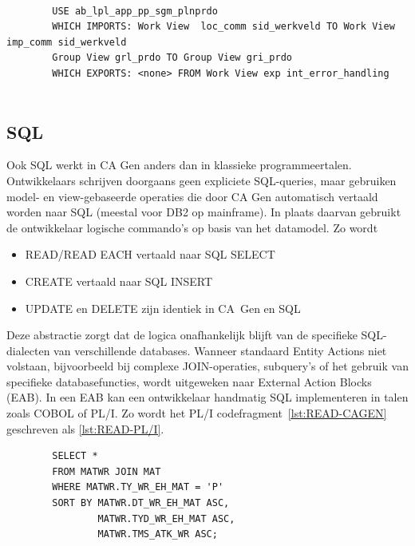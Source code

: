 \begin{listing}[h]
    \caption[Voorbeeld CA Gen-code: USE-statement]{CA Gen-code met een USE-statement en view matching}
    \label{lst:CAGEN-USE}
    \begin{verbatim}
        
        USE ab_lpl_app_pp_sgm_plnprdo
        WHICH IMPORTS: Work View  loc_comm sid_werkveld TO Work View imp_comm sid_werkveld
        Group View grl_prdo TO Group View gri_prdo
        WHICH EXPORTS: <none> FROM Work View exp int_error_handling
        
    \end{verbatim}
\end{listing}

\subsection{SQL}
Ook SQL werkt in CA Gen anders dan in klassieke programmeertalen. Ontwikkelaars schrijven doorgaans geen expliciete SQL-queries, maar gebruiken model- en view-gebaseerde operaties die door CA Gen automatisch vertaald worden naar SQL (meestal voor DB2 op mainframe). In plaats daarvan gebruikt de ontwikkelaar logische commando's op basis van het datamodel. Zo wordt
\begin{itemize}
    \item READ/READ EACH vertaald naar SQL SELECT
    \item CREATE vertaald naar SQL INSERT
    \item UPDATE en DELETE zijn identiek in CA~Gen en SQL
\end{itemize}
Deze abstractie zorgt dat de logica onafhankelijk blijft van de specifieke SQL-dialecten van verschillende databases. Wanneer standaard Entity Actions niet volstaan, bijvoorbeeld bij complexe JOIN-operaties, subquery's of het gebruik van specifieke databasefuncties, wordt uitgeweken naar External Action Blocks (EAB).
In een EAB kan een ontwikkelaar handmatig SQL implementeren in talen zoals COBOL of PL/I. Zo wordt het PL/I codefragment~\ref{lst:READ-CAGEN} geschreven als \ref{lst:READ-PL/I}.

\begin{listing}[h]
    \caption[PL/I tegenhanger van CA Gen READ]{PL/I tegenhanger van CA Gen READ}
    \label{lst:READ-PL/I}
    \begin{verbatim}
        SELECT *
        FROM MATWR JOIN MAT
        WHERE MATWR.TY_WR_EH_MAT = 'P'
        SORT BY MATWR.DT_WR_EH_MAT ASC,
                MATWR.TYD_WR_EH_MAT ASC,
                MATWR.TMS_ATK_WR ASC;        
    \end{verbatim}
\end{listing}

